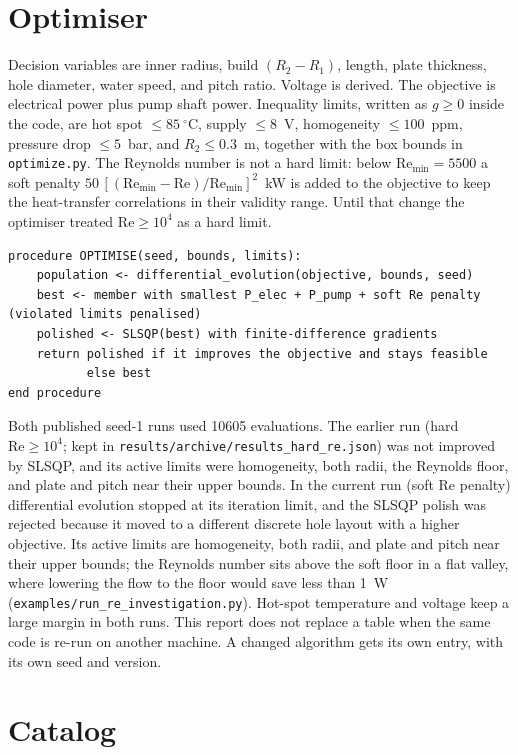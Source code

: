 \documentclass[11pt]{article}
\begin{document}
\section{Optimiser}

Decision variables are inner radius, build $(R_2-R_1)$, length, plate thickness, hole diameter, water speed, and pitch ratio.
Voltage is derived.
The objective is electrical power plus pump shaft power.
Inequality limits, written as $g\ge 0$ inside the code, are hot spot $\le 85~^\circ$C, supply $\le 8$~V, homogeneity $\le 100$~ppm, pressure drop $\le 5$~bar, and $R_2\le 0.3$~m, together with the box bounds in \texttt{optimize.py}.
The Reynolds number is not a hard limit: below $\mathrm{Re}_{\min}=5500$ a soft penalty $50\,[(\mathrm{Re}_{\min}-\mathrm{Re})/\mathrm{Re}_{\min}]^2$~kW is added to the objective to keep the heat-transfer correlations in their validity range.
Until that change the optimiser treated $\mathrm{Re}\ge 10^4$ as a hard limit.

\begin{verbatim}
procedure OPTIMISE(seed, bounds, limits):
    population <- differential_evolution(objective, bounds, seed)
    best <- member with smallest P_elec + P_pump + soft Re penalty (violated limits penalised)
    polished <- SLSQP(best) with finite-difference gradients
    return polished if it improves the objective and stays feasible
           else best
end procedure
\end{verbatim}

Both published seed-1 runs used 10605 evaluations.
The earlier run (hard $\mathrm{Re}\ge 10^4$; kept in \texttt{results/archive/results\_hard\_re.json}) was not improved by SLSQP, and its active limits were homogeneity, both radii, the Reynolds floor, and plate and pitch near their upper bounds.
In the current run (soft Re penalty) differential evolution stopped at its iteration limit, and the SLSQP polish was rejected because it moved to a different discrete hole layout with a higher objective.
Its active limits are homogeneity, both radii, and plate and pitch near their upper bounds; the Reynolds number sits above the soft floor in a flat valley, where lowering the flow to the floor would save less than 1~W (\texttt{examples/run\_re\_investigation.py}).
Hot-spot temperature and voltage keep a large margin in both runs.
This report does not replace a table when the same code is re-run on another machine.
A changed algorithm gets its own entry, with its own seed and version.

\section{Catalog}
\end{document}
